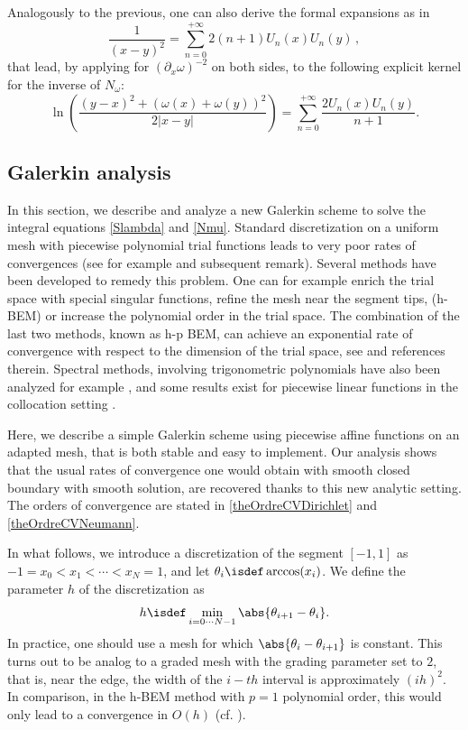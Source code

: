 \documentclass[a4paper]{article}
\begin{document}
	Analogously to the previous, one can also derive the formal expansions as in \cite{jerez2012explicit}
	\[\frac{1}{(x-y)^2} = \sum_{n=0}^{+\infty} 2(n+1)U_n(x)U_n(y)\,,\]
	that lead, by applying for $(\partial_x\omega)^{-2}$ on both sides, to the following explicit kernel for the inverse of $N_\omega$:
	\[\ln\left(\dfrac{(y-x)^2 + (\omega(x) + \omega(y))^2}{2|x-y|}\right) = \sum_{n=0}^{+\infty} \dfrac{2 U_n(x) U_n(y)}{n+1}.\]


\subsection{Galerkin analysis}


In this section, we describe and analyze a new Galerkin scheme to solve the integral equations \eqref{Slambda} and \eqref{Nmu}. Standard discretization on a uniform mesh with piecewise polynomial trial functions leads to very poor rates of convergences (see for example \cite[Chap. 4, ]{sauter2011boundary} and subsequent remark). Several methods have been developed to remedy this problem. One can for example enrich the trial space with special singular functions, refine the mesh near the segment tips, (h-BEM) or increase the polynomial order in the trial space. The combination of the last two methods, known as h-p BEM, can achieve an exponential rate of convergence with respect to the dimension of the trial space, see \cite{postell1990h} and references therein. Spectral methods, involving trigonometric polynomials have also been analyzed for example \cite{bruno2012second}, and some results exist for piecewise linear functions in the collocation setting \cite{costabel1988convergence}. 

Here, we describe a simple Galerkin scheme using piecewise affine functions on an adapted mesh, that is both stable and easy to implement. Our analysis shows that the usual rates of convergence one would obtain with smooth closed boundary with smooth solution, are recovered thanks to this new analytic setting. The orders of convergence are stated in \autoref{theOrdreCVDirichlet} and \autoref{theOrdreCVNeumann}. 

In what follows, we introduce a discretization of the segment $[-1,1]$ as $-1 = x_0 < x_1 < \cdots < x_N = 1$, and let $\theta_i \isdef \arccos(x_i)$. We define the parameter $h$ of the discretization as 
\[ h \isdef \min_{i=0\cdots N-1} \abs{\theta_{i+1} - \theta_{i}}.\]
In practice, one should use a mesh for which $\abs{\theta_i - \theta_{i+1}}$ is constant. This turns out to be analog to a graded mesh with the grading parameter set to $2$, that is, near the edge, the width of the $i-th$ interval is approximately $(ih)^2$. In comparison, in the h-BEM method with $p=1$ polynomial order, this would only lead to a convergence in $O(h)$ (cf. \cite[Theorem 1.3]{postell1990h}).
\end{document}
